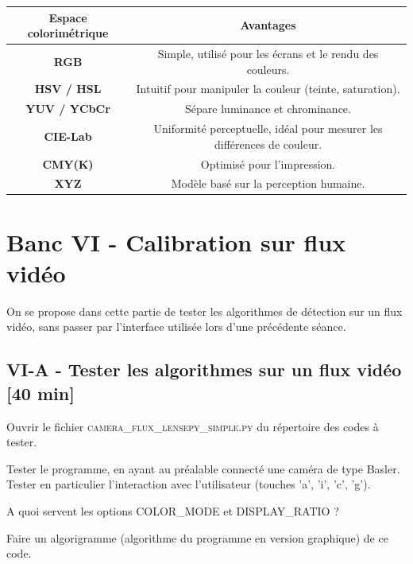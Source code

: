 \documentclass[a4paper,11pt,titlepage]{article} %
\begin{document}
\begin{center}
\begin{tabular}{|c|c|}
\hline
\textbf{Espace colorimétrique} & \textbf{Avantages} \\ \hline
\textbf{RGB} & Simple, utilisé pour les écrans et le rendu des couleurs. \\ \hline
\textbf{HSV / HSL} & Intuitif pour manipuler la couleur (teinte, saturation). \\ \hline
\textbf{YUV / YCbCr} & Sépare luminance et chrominance. \\ \hline
\textbf{CIE-Lab} & Uniformité perceptuelle, idéal pour mesurer les différences de couleur. \\ \hline
\textbf{CMY(K)} & Optimisé pour l'impression. \\ \hline
\textbf{XYZ} & Modèle basé sur la perception humaine. \\ \hline
\end{tabular}
\end{center}



\newpage

\section{Banc VI - Calibration sur flux vidéo}

On se propose dans cette partie de tester les algorithmes de détection sur un flux vidéo, sans passer par l'interface utilisée lors d'une précédente séance.

\subsection{VI-A - Tester les algorithmes sur un flux vidéo {[40 min]}}

\Manip Ouvrir le fichier \textsc{camera\_flux\_lensepy\_simple.py} du répertoire des codes à tester.

\Manip Tester le programme, en ayant au préalable connecté une caméra de type Basler. Tester en particulier l'interaction avec l'utilisateur (touches 'a', 'i', 'c', 'g').

\Quest A quoi servent les options \textsc{COLOR\_MODE}  et \textsc{DISPLAY\_RATIO} ?

\Quest Faire un algorigramme (algorithme du programme en version graphique) de ce code.
\end{document}
